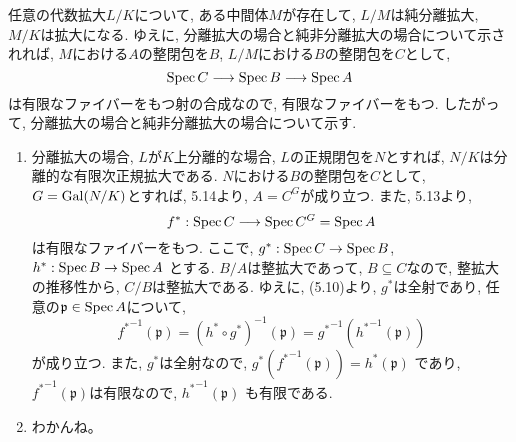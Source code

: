 \documentclass[dvipdfmx]{jsarticle}
\begin{document}
    \begin{problem}
        任意の代数拡大$L/K$について,
        ある中間体$M$が存在して,
        $L/M$は純分離拡大, $M/K$は拡大になる.
        ゆえに, 分離拡大の場合と純非分離拡大の場合について示されれば,
        $M$における$A$の整閉包を$B$, $L/M$における$B$の整閉包を$C$として,
        \[
            \operatorname{Spec}{C} \longrightarrow \operatorname{Spec}{B} \longrightarrow \operatorname{Spec}{A}
        \]
        は有限なファイバーをもつ射の合成なので, 有限なファイバーをもつ.
        したがって, 分離拡大の場合と純非分離拡大の場合について示す.

        \begin{enumerate}
            \item 分離拡大の場合,
            \color{red}
            $L$が$K$上分離的な場合, $L$の正規閉包を$N$とすれば,
            $N/K$は分離的な有限次正規拡大である.
            \color{black}
            $N$における$B$の整閉包を$C$として, $G = \operatorname{Gal}(N/K)$とすれば,
            5.14より, $A = C^G$が成り立つ.
            また, 5.13より,
            \[
                f^\ast: \operatorname{Spec}{C} \longrightarrow \operatorname{Spec}{C^G} = \operatorname{Spec}{A}
            \]
            は有限なファイバーをもつ.
            ここで, $g^\ast: \operatorname{Spec}{C} \to \operatorname{Spec}{B}$, $h^\ast: \operatorname{Spec}{B} \to \operatorname{Spec}{A}$
            とする.
            $B/A$は整拡大であって, $B \subseteq C$なので, 整拡大の推移性から,
            $C/B$は整拡大である.
            ゆえに,
            (5.10)より, $g^\ast$は全射であり,
            任意の$\mathfrak{p} \in \operatorname{Spec}{A}$について,
            \[
                {f^{\ast}}^{-1}(\mathfrak{p}) = (h^\ast \circ g^\ast)^{-1}(\mathfrak{p}) = {g^\ast}^{-1}({h^\ast}^{-1}(\mathfrak{p}))
            \]
            が成り立つ.
            また, $g^\ast$は全射なので, $g^\ast({f^\ast}^{-1}(\mathfrak{p})) = h^\ast(\mathfrak{p})$
            であり, ${f^\ast}^{-1}(\mathfrak{p})$は有限なので, ${h^\ast}^{-1}(\mathfrak{p})$
            も有限である.
            \item
            \color{red}
            わかんね。
            \color{black}
        \end{enumerate}



    \end{problem}
\end{document}
